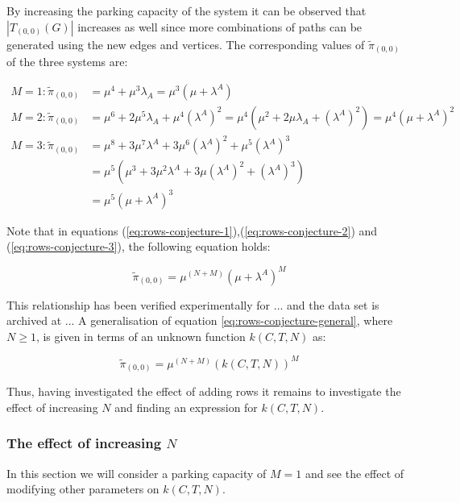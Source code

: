 By increasing the parking capacity of the system it can be observed that \(|T_{(0,0)}(G)|\) increases as well since more combinations of paths can be generated using the new edges and vertices. 
The corresponding values of \(\tilde{\pi}_{(0,0)}\) of the three systems are:

\begin{align}
    M = 1: \tilde{\pi}_{(0,0)} &= \mu^4 + \mu^3 \lambda_A = \mu^3 (\mu + \lambda^A) \label{eq:rows-conjecture-1}\\
    M = 2: \tilde{\pi}_{(0,0)} &= \mu^6 + 2\mu^5 \lambda_A + \mu^4 (\lambda^A)^2 = \mu^4(\mu^2 + 2\mu \lambda_A + (\lambda^A)^2) = \mu^4 (\mu + \lambda^A) ^ 2 \label{eq:rows-conjecture-2}\\
    M = 3: \tilde{\pi}_{(0,0)} &= \mu^8 + 3 \mu^7 \lambda^A + 3 \mu^6 (\lambda^A)^2 + \mu^5(\lambda^A)^3 \nonumber \\
    &= \mu^5 (\mu^3 + 3 \mu ^2 \lambda^A + 3 \mu (\lambda^A)^2 + (\lambda^A)^3) \nonumber \\
    &= \mu^5 (\mu + \lambda^A) ^ 3 \label{eq:rows-conjecture-3}
\end{align}

Note that in equations (\ref{eq:rows-conjecture-1}),(\ref{eq:rows-conjecture-2}) and (\ref{eq:rows-conjecture-3}), the following equation holds: 

\begin{equation}\label{eq:rows-conjecture-general}
    \tilde{\pi}_{(0,0)} = \mu^{(N+M)} (\mu + \lambda^A)^M
\end{equation}

This relationship has been verified experimentally for ... and the data set is archived at ... 
A generalisation of equation \ref{eq:rows-conjecture-general}, where \(N \geq 1\), is given in terms of an unknown function \(k(C,T,N)\) as:

\begin{equation}
    \tilde{\pi}_{(0,0)} = \mu^{(N+M)} (k(C,T,N))^M
\end{equation}

Thus, having investigated the effect of adding rows it remains to investigate the effect of increasing \(N\) and finding an expression for \(k(C,T,N)\).

\subsubsection{The effect of increasing \(N\)}
In this section we will consider a parking capacity of \(M=1\) and see the effect of modifying other parameters on \(k(C, T, N)\).

